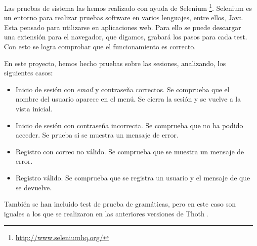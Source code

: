 Las pruebas de sistema las hemos realizado con ayuda de Selenium \footnote{\url{http://www.seleniumhq.org/}}. Selenium es un entorno para realizar pruebas software en varios lenguajes, entre ellos, Java. Esta pensado para utilizarse en aplicaciones web. Para ello se puede descargar una extensión para el navegador, que digamos, grabará los pasos para cada test. Con esto se logra comprobar que el funcionamiento es correcto.

En este proyecto, hemos hecho pruebas sobre las sesiones, analizando, los siguientes casos:

\begin{itemize}
\item Inicio de sesión con \emph{email} y contraseña correctos. Se comprueba que el nombre del usuario aparece en el menú. Se cierra la sesión y se vuelve a la vista inicial.
\item Inicio de sesión con contraseña incorrecta. Se comprueba que no ha podido acceder. Se prueba si se muestra un mensaje de error.
\item Registro con correo no válido. Se comprueba que se muestra un mensaje de error. 
\item Registro válido. Se comprueba que se registra un usuario y el mensaje de que se devuelve.

\end{itemize}

También se han incluido test de prueba de gramáticas, pero en este caso son iguales a los que se realizaron en las anteriores versiones de Thoth \cite{thothv2}. 
